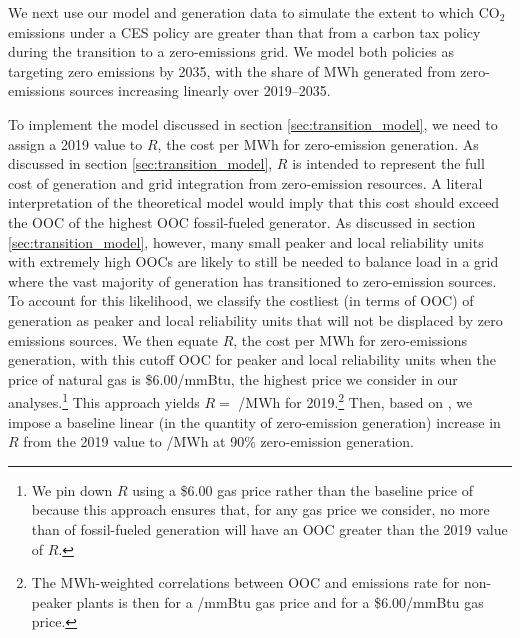 \documentclass[12pt]{article}
\begin{document}
We next use our model and generation data to simulate the extent to which CO$_2$ emissions under a CES policy are greater than that from a carbon tax policy during the transition to a zero-emissions grid. We model both policies as targeting zero emissions by 2035, with the share of MWh generated from zero-emissions sources increasing linearly over 2019--2035.

To implement the model discussed in section \ref{sec:transition_model}, we need to assign a 2019 value to $R$, the cost per MWh for zero-emission generation. As discussed in section \ref{sec:transition_model}, $R$ is intended to represent the full cost of generation and grid integration from zero-emission resources. A literal interpretation of the theoretical model would imply that this cost should exceed the OOC of the highest OOC fossil-fueled generator. As discussed in section \ref{sec:transition_model}, however, many small peaker and local reliability units with extremely high OOCs are likely to still be needed to balance load in a grid where the vast majority of generation has transitioned to zero-emission sources. To account for this likelihood, we classify the costliest (in terms of OOC) of generation as peaker and local reliability units that will not be displaced by zero emissions sources. We then equate $R$, the cost per MWh for zero-emissions generation, with this cutoff OOC for peaker and local reliability units when the price of natural gas is \$6.00/mmBtu, the highest price we consider in our analyses.\footnote{We pin down $R$ using a \$6.00 gas price rather than the baseline price of because this approach ensures that, for any gas price we consider, no more than of fossil-fueled generation will have an OOC greater than the 2019 value of $R$.} This approach yields $R=$ \unskip /MWh for 2019.\footnote{The MWh-weighted correlations between OOC and emissions rate for non-peaker plants is then for a \unskip/mmBtu gas price and for a \$6.00/mmBtu gas price.} Then, based on \cite{phadke20202035}, we impose a baseline linear (in the quantity of zero-emission generation) increase in $R$ from the 2019 value to \unskip /MWh at 90\% zero-emission generation.
\end{document}
